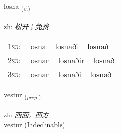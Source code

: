 \documentclass[frontgrid, backgrid]{flacards}\usepackage[]{graphicx}\usepackage[]{color}
\begin{document}
\renewcommand{\blhead}{\vskip5pt {\small\bfseries\footnotesize Sagnorð | 动词 }}
\renewcommand{\bcfoot}{\vskip5pt \hspace{2pt}{\small\bfseries\footnotesize 2K}}


{losna \small{\textsubscript{(\textit{v.})}} \\[1ex] %
\textphonetic{[lɔstna]} \\
zh: \emph{松开；免费} \\  [2ex]
\renewcommand*{\arraystretch}{0.8}
\begin{tabular}{p{1cm}l}
\textsc{1sg}: & losna -- losnaði -- losnað \\ 
\textsc{2sg}: & losnar -- losnaðir -- losnað \\ 
\textsc{3sg}: & losnar -- losnaði -- losnað \\ 
\end{tabular}
}


\renewcommand{\flhead}{\vskip5pt \fboxsep=0pt {\small\bfseries\footnotesize Forsetning | 介词}}
\renewcommand{\fcfoot}{\vskip5pt \fboxsep=0pt \hspace{2pt}{\small\bfseries\footnotesize 2K}}

\renewcommand{\blhead}{\vskip5pt {\small\bfseries\footnotesize Forsetning | 介词 }}
\renewcommand{\bcfoot}{\vskip5pt \hspace{2pt}{\small\bfseries\footnotesize 2K}}


{vestur \small{\textsubscript{(\textit{prep.})}} \\[1ex]
\textphonetic{[vɛstʏr]} \\
zh: \emph{西面，西方} \\  [2ex]
vestur (Indeclinable)}


\renewcommand{\flhead}{\vskip5pt \fboxsep=0pt {\small\bfseries\footnotesize Forsetning | 介词}}
\renewcommand{\fcfoot}{\vskip5pt \fboxsep=0pt \hspace{2pt}{\small\bfseries\footnotesize 2K}}
\end{document}
